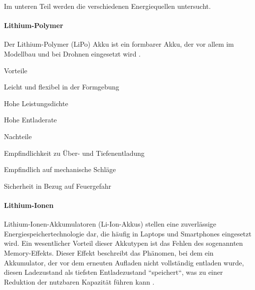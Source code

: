 \documentclass[../main.tex]{subfiles}
\begin{document}
Im unteren Teil werden die verschiedenen Energiequellen untersucht.

\paragraph{Lithium-Polymer}
Der Lithium-Polymer (LiPo) Akku ist ein formbarer Akku, der vor allem im Modellbau und bei Drohnen eingesetzt wird \cite{lipo}.
 

\begin{minipage}[t]{0.48\textwidth}
\begin{items}
  \item [Vorteile]
  \item Leicht und flexibel in der Formgebung
  \item Hohe Leistungsdichte
  \item Hohe Entladerate
\end{items}
\end{minipage}
\hfill
\begin{minipage}[t]{0.48\textwidth}
\begin{items}
  \item [Nachteile]
  \item Empfindlichkeit zu Über- und Tiefenentladung
  \item Empfindlich auf mechanische Schläge
  \item Sicherheit in Bezug auf Feuergefahr
\end{items}
\end{minipage}


\paragraph{Lithium-Ionen}

Lithium-Ionen-Akkumulatoren (Li-Ion-Akkus) stellen eine zuverlässige Energiespeichertechnologie dar, die häufig in Laptops und Smartphones eingesetzt wird. Ein wesentlicher Vorteil dieser Akkutypen ist das Fehlen des sogenannten Memory-Effekts. Dieser Effekt beschreibt das Phänomen, bei dem ein Akkumulator, der vor dem erneuten Aufladen nicht vollständig entladen wurde, diesen Ladezustand als tiefsten Entladezustand ``speichert``, was zu einer Reduktion der nutzbaren Kapazität führen kann \cite{li-ion}.
\end{document}
